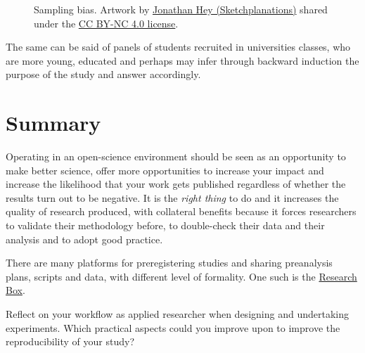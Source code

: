 \documentclass[
  11pt,
  letterpaper,
]{scrbook}
\theoremstyle{definition}
\theoremstyle{definition}
\theoremstyle{remark}
\begin{document}
\begin{figure}[ht!]


\caption{\label{fig-samplingbias}Sampling bias. Artwork by
\href{https://sketchplanations.com/sampling-bias}{Jonathan Hey
(Sketchplanations)} shared under the
\href{http://creativecommons.org/licenses/by-nc/4.0/}{CC BY-NC 4.0
license}.}

\end{figure}%

The same can be said of panels of students recruited in universities
classes, who are more young, educated and perhaps may infer through
backward induction the purpose of the study and answer accordingly.

\section{Summary}\label{summary-4}

Operating in an open-science environment should be seen as an
opportunity to make better science, offer more opportunities to increase
your impact and increase the likelihood that your work gets published
regardless of whether the results turn out to be negative. It is the
\emph{right thing} to do and it increases the quality of research
produced, with collateral benefits because it forces researchers to
validate their methodology before, to double-check their data and their
analysis and to adopt good practice.

There are many platforms for preregistering studies and sharing
preanalysis plans, scripts and data, with different level of formality.
One such is the \href{https://researchbox.org/}{Research Box}.

\begin{tcolorbox}[enhanced jigsaw, left=2mm, leftrule=.75mm, coltitle=black, breakable, bottomrule=.15mm, colframe=quarto-callout-tip-color-frame, titlerule=0mm, colbacktitle=quarto-callout-tip-color!10!white, rightrule=.15mm, toprule=.15mm, title=\textcolor{quarto-callout-tip-color}{\faLightbulb}\hspace{0.5em}{Your turn}, opacityback=0, toptitle=1mm, bottomtitle=1mm, arc=.35mm, opacitybacktitle=0.6, colback=white]

Reflect on your workflow as applied researcher when designing and
undertaking experiments. Which practical aspects could you improve upon
to improve the reproducibility of your study?

\end{tcolorbox}
\end{document}
